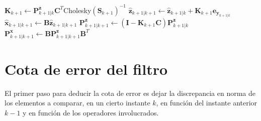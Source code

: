 \begin{algorithm}[h]
\begin{algorithmic}[1]
    \State $\mathbf{K}_{k+1} \gets \mathbf{P}^{\mathbf{z}}_{k+1|k} \mathbf{C}^T$Cholesky$(\mathbf{S}_{k+1})^{-1}$
    \State $\hat{\mathbf{z}}_{k+1|k+1} \gets \hat{\mathbf{z}}_{k+1|k} + \mathbf{K}_{k+1} \mathbf{e}_{\mathbf{y}_{k+1|k}}$
    \State $\hat{\mathbf{x}}_{k+1|k+1} \gets \mathbf{B}\hat{\mathbf{z}}_{k+1|k+1}$
    \State $\mathbf{P}^\mathbf{z}_{k+1|k+1} \gets (\mathbf{I} - \mathbf{K}_{k+1} 
    \mathbf{C}) \mathbf{P}^{\mathbf{z}}_{k+1|k}$
    \State $\mathbf{P}^\mathbf{x}_{k+1|k+1} \gets \mathbf{B}\mathbf{P}^\mathbf{z}_{k+1|k+1} \mathbf{B}^T$
\EndFor
\end{algorithmic}
\end{algorithm}

\section{Cota de error del filtro}

El primer paso para deducir la cota de error es dejar la discrepancia en norma de los elementos a comparar, en un cierto instante $k$, en función del instante anterior $k-1$ y en función de los operadores involucrados.

